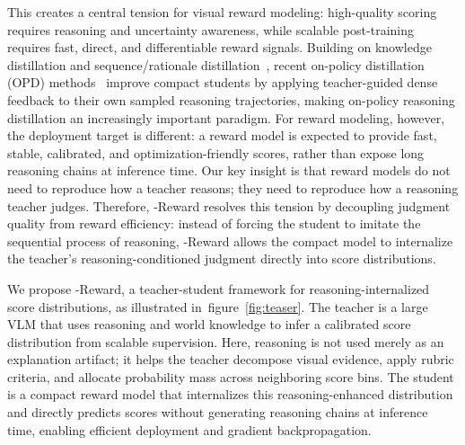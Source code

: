 \documentclass{llmxive}
\providecommand{\mname}{\twemoji[width=0.75em]{zap}-Reward\xspace}
\providecommand{\figref}[1]{figure~\ref{#1}}
\begin{document}
This creates a central tension for visual reward modeling: high-quality scoring requires reasoning and uncertainty awareness, while scalable post-training requires fast, direct, and differentiable reward signals. Building on knowledge distillation and sequence/rationale distillation~\cite{hinton2015distilling,kim2016sequence,hsieh2023distilling,gu2024minillm}, recent on-policy distillation (OPD) methods~\cite{lu2025onpolicy, zhao2026selfdistilledreasoneronpolicyselfdistillation, fu2026revisitingonpolicydistillationempirical,song2026surveyonpolicydistillationlarge, li2026rethinkingonpolicydistillationlarge, cui2026briefoverviewonpolicyselfdistillation} improve compact students by applying teacher-guided dense feedback to their own sampled reasoning trajectories, making on-policy reasoning distillation an increasingly important paradigm. For reward modeling, however, the deployment target is different: a reward model is expected to provide fast, stable, calibrated, and optimization-friendly scores, rather than expose long reasoning chains at inference time. Our key insight is that reward models do not need to reproduce how a teacher reasons; they need to reproduce how a reasoning teacher judges. Therefore, \mname resolves this tension by decoupling judgment quality from reward efficiency: instead of forcing the student to imitate the sequential process of reasoning, \mname allows the compact model to internalize the teacher's reasoning-conditioned judgment directly into score distributions.




We propose \mname, a teacher-student framework for reasoning-internalized score distributions, as illustrated in~\figref{fig:teaser}. The teacher is a large VLM that uses reasoning and world knowledge to infer a calibrated score distribution from scalable supervision. Here, reasoning is not used merely as an explanation artifact; it helps the teacher decompose visual evidence, apply rubric criteria, and allocate probability mass across neighboring score bins. The student is a compact reward model that internalizes this reasoning-enhanced distribution and directly predicts scores without generating reasoning chains at inference time, enabling efficient deployment and gradient backpropagation.
\end{document}
